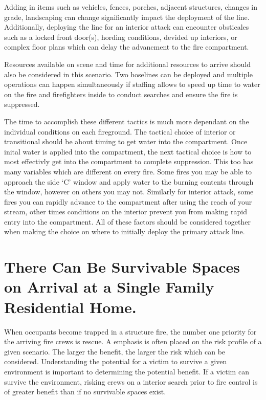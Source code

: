 \documentclass[12pt,oneside]{book}
\begin{document}
Adding in items such as vehicles, fences, porches, adjacent structures, changes in grade, landscaping can change significantly impact the deployment of the line. Additionally, deploying the line for an interior attack can encounter obsticales such as a locked front door(s), hording conditions, devided up interiors, or complex floor plans which can delay the advancment to the fire compartment. 

Resources available on scene and time for additional resources to arrive should also be considered in this scenario. Two hoselines can be deployed and multiple operations can happen simultaneously if staffing allows to speed up time to water on the fire and firefighters inside to conduct searches and ensure the fire is suppressed.

The time to accomplish these different tactics is much more dependant on the individual conditions on each fireground. The tactical choice of interior or transitional should be about timing to get water into the compartment. Once inital water is applied into the compartment, the next tactical choice is how to most effectivly get into the compartment to complete suppression. This too has many variables which are different on every fire. Some fires you may be able to approach the side `C' window and apply water to the burning contents through the window, however on others you may not. Similarly for interior attack, some fires you can rapidly advance to the compartment after using the reach of your stream, other times conditions on the interior prevent you from making rapid entry into the compartment. All of these factors should be considered together when making the choice on where to initially deploy the primary attack line. 

\section{There Can Be Survivable Spaces on Arrival at a Single Family Residential Home.} \label{tc:survivable_spaces}
When occupants become trapped in a structure fire, the number one priority for the arriving fire crews is rescue. A emphasis is often placed on the risk profile of a given scenario. The larger the benefit, the larger the risk which can be considered. Understanding the potential for a victim to survive a given environment is important to determining the potential benefit. If a victim can survive the environment, risking crews on a interior search prior to fire control is of greater benefit than if no survivable spaces exist. 
\end{document}
